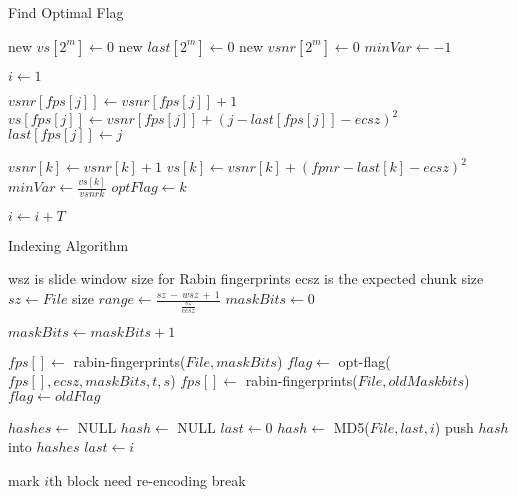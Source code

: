 \documentclass[a4paper, 12pt]{article}
\begin{document}
\begin{algorithm}
\caption{Find Optimal Flag}
\begin{algorithmic}[1]
\State new $vs[2^m] \gets 0$
\State new $last[2^m] \gets 0$
\State new $vsnr[2^m] \gets 0$
\State $minVar \gets -1$

\State $i \gets 1$

        \State $vsnr[fps[j]] \gets vsnr[fps[j]] + 1$
        \State $vs[fps[j]] \gets vsnr[fps[j]] + (j - last[fps[j]] - ecsz)^2$
        \State $last[fps[j]] \gets j$
    \EndIf
\EndFor

    \State $vsnr[k] \gets vsnr[k] + 1$
    \State $vs[k] \gets vsnr[k] + (fpnr - last[k] - ecsz)^2$
        \State $minVar \gets \frac{vs[k]}{vsnr{k}}$
        \State $optFlag \gets k$
    \EndIf
\EndFor

\State $i \gets i + T$
\EndWhile

\EndProcedure
\end{algorithmic}
\end{algorithm}

\begin{algorithm}                      
\caption{Indexing Algorithm}          
\begin{algorithmic}                    
\State \Comment wsz is slide window size for Rabin fingerprints
\State \Comment ecsz is the expected chunk size
  \State $sz \gets File$ size          
  \State $range \gets \frac{sz\ -\ wsz\ +\ 1}{\frac{sz}{ecsz}}$   
  \State $maskBits \gets 0$

      \State $maskBits \gets maskBits + 1$
  \EndWhile

      \State $fps[] \gets$ rabin-fingerprints($File, maskBits$)
      \State $flag \gets$ opt-flag($fps[], ecsz, maskBits, t, s$)
  \Else
      \State $fps[] \gets$ rabin-fingerprints($File, oldMaskbits$)
      \State $flag \gets oldFlag$
  \EndIf


  \State $hashes \gets$ NULL
  \State $hash \gets$ NULL
  \State $last \gets 0$
          \State $hash \gets $ MD5($File, last, i$)
          \State push $hash$ into $hashes$
          \State $last \gets i$
      \EndIf
  \EndFor

              \State mark $i$th block need re-encoding
              \State break
          \EndIf
      \EndFor
  \EndFor
\EndProcedure
\end{algorithmic}
\end{algorithm}
\end{document}
